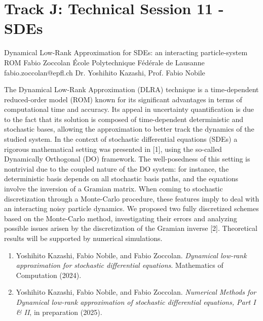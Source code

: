 \section{Track J: Technical Session 11 - SDEs}\newpage

\begin{talk}
  {Dynamical Low-Rank Approximation for SDEs: an interacting particle-system ROM}%
  {Fabio Zoccolan}%
  {\'Ecole Polytechnique F\'ed\'erale de Lausanne}%
  {fabio.zoccolan@epfl.ch}%
  {Dr. Yoshihito Kazashi, Prof. Fabio Nobile}%
  
The Dynamical Low-Rank Approximation (DLRA) technique is a time-dependent reduced-order model (ROM) known for its significant advantages in terms of computational time and accuracy. Its appeal in uncertainty quantification is due to the fact that its solution is composed of time-dependent deterministic and stochastic bases, allowing the approximation to better track the dynamics of the studied system. In the context of stochastic differential equations (SDEs) a rigorous mathematical setting was presented in [1], using the so-called Dynamically Orthogonal (DO) framework. The well-posedness of this setting is nontrivial due to the coupled nature of the DO system: for instance, the deterministic basis depends on all stochastic basis paths, and the equations involve the inversion of a Gramian matrix. When coming to stochastic discretization through a Monte-Carlo procedure, these features imply to deal with an interacting noisy particle dynamics. We proposed two fully discretized schemes based on the Monte-Carlo method, investigating their errors and analyzing possible issues arisen by the discretization of the Gramian inverse [2]. Theoretical results will be supported by numerical simulations.

\medskip
\begin{enumerate}
 \item[{[1]}] Yoshihito Kazashi, Fabio Nobile, and Fabio Zoccolan. {\it Dynamical low-rank approximation for stochastic differential equations}. Mathematics of Computation (2024).
 \item[{[2]}] Yoshihito Kazashi, Fabio Nobile, and Fabio Zoccolan. {\it Numerical Methods for Dynamical low-rank approximation of stochastic differential equations, Part I \& II}, in preparation (2025).
\end{enumerate}

\end{talk}

